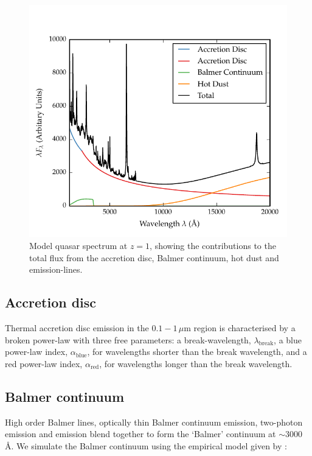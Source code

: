 \begin{figure}[h!]
  \centering
  \includegraphics[width=\textwidth]{figures/chapter05/sed_model.pdf}
  \caption[{Model quasar spectrum at $z=1$.}]{Model quasar spectrum at $z=1$, showing the contributions to the total flux from the accretion disc, Balmer continuum, hot dust and emission-lines. }
  \label{fig:modelsed}
\end{figure}

\subsection{Accretion disc}

Thermal accretion disc emission in the $0.1 - 1$\,$\mu$m region is characterised by a broken power-law with three free parameters: a break-wavelength, $\lambda_{\text{break}}$, a blue power-law index, $\alpha_{\text{blue}}$, for wavelengths shorter than the break wavelength, and a red power-law index, $\alpha_{\text{red}}$, for wavelengths longer than the break wavelength.

\subsection{Balmer continuum}

High order Balmer lines, optically thin Balmer continuum emission, two-photon emission and  emission blend together to form the `Balmer' continuum at $\sim3000$\,\AA.
We simulate the Balmer continuum using the empirical model given by \citet{grandi82}: 

